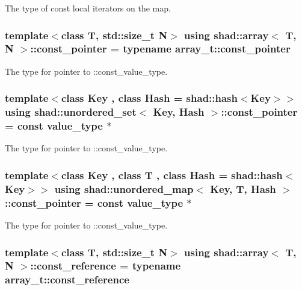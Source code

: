The type of const local iterators on the map. 

\hypertarget{group__Types_gaf7a2ac6cd741ccfb7bbb1378fbc85218}{
\subsubsection[{const\-\_\-pointer}]{\setlength{\rightskip}{0pt plus 5cm}template$<$class T, std\-::size\-\_\-t N$>$ using {\bf shad\-::array}$<$ T, N $>$\-::const\-\_\-pointer =  typename array\-\_\-t\-::const\-\_\-pointer}}\label{group__Types_gaf7a2ac6cd741ccfb7bbb1378fbc85218}


The type for pointer to \-::const\-\_\-value\-\_\-type. 

\hypertarget{group__Types_ga3d079442c0e215d47f0c93f05b2ddb1f}{
\subsubsection[{const\-\_\-pointer}]{\setlength{\rightskip}{0pt plus 5cm}template$<$class Key , class Hash  = shad\-::hash$<$\-Key$>$$>$ using {\bf shad\-::unordered\-\_\-set}$<$ Key, Hash $>$\-::const\-\_\-pointer =  const value\-\_\-type $\ast$}}\label{group__Types_ga3d079442c0e215d47f0c93f05b2ddb1f}


The type for pointer to \-::const\-\_\-value\-\_\-type. 

\hypertarget{group__Types_ga4db9d56c27ddb72ccad61249ef55c54c}{
\subsubsection[{const\-\_\-pointer}]{\setlength{\rightskip}{0pt plus 5cm}template$<$class Key , class T , class Hash  = shad\-::hash$<$\-Key$>$$>$ using {\bf shad\-::unordered\-\_\-map}$<$ Key, T, Hash $>$\-::const\-\_\-pointer =  const value\-\_\-type $\ast$}}\label{group__Types_ga4db9d56c27ddb72ccad61249ef55c54c}


The type for pointer to \-::const\-\_\-value\-\_\-type. 

\hypertarget{group__Types_gaac06273bdbb48ad582528e12e76bd859}{
\subsubsection[{const\-\_\-reference}]{\setlength{\rightskip}{0pt plus 5cm}template$<$class T, std\-::size\-\_\-t N$>$ using {\bf shad\-::array}$<$ T, N $>$\-::const\-\_\-reference =  typename array\-\_\-t\-::const\-\_\-reference}}\label{group__Types_gaac06273bdbb48ad582528e12e76bd859}


